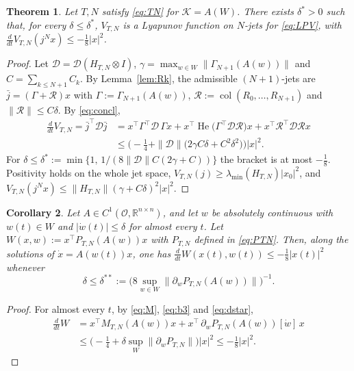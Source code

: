 \documentclass[preprint,12pt,authoryear]{elsarticle}
\newtheorem{theorem}{Theorem}
\newtheorem{corollary}[theorem]{Corollary}
\theoremstyle{definition}
\theoremstyle{remark}
\newcommand{\R}{\mathbb{R}}
\newcommand{\tr}{^{\top}}
\newcommand{\DD}{\mathcal{D}}
\newcommand{\KK}{\mathcal{K}}
\DeclareMathOperator{\He}{He}
\DeclareMathOperator{\col}{col}
\begin{document}
\begin{theorem}\label{thm:tv}
Let $T,N$ satisfy \eqref{eq:TN} for $\KK=A(W)$. There exists $\delta^*>0$ such that, for every $\delta\le\delta^*$, $V_{T,N}$ is a Lyapunov function on $N$-jets for \eqref{eq:LPV}, with $\frac{d}{dt}V_{T,N}(j^Nx)\le-\frac18|x|^2$.
\end{theorem}
\begin{proof}
Let $\DD=\DD(H_{T,N}\otimes I)$, $\gamma=\max_{w\in W}\|\Gamma_{N+1}(A(w))\|$ and $C=\sum_{k\le N+1}C_k$. By Lemma~\ref{lem:Rk}, the admissible $(N+1)$-jets are $\bar j=(\Gamma+\mathcal R)x$ with $\Gamma:=\Gamma_{N+1}(A(w))$, $\mathcal R:=\col(R_0,\dots,R_{N+1})$ and $\|\mathcal R\|\le C\delta$. By \eqref{eq:concl},
\begin{align}
\frac{d}{dt}V_{T,N}=\bar j\tr\DD\bar j
&=x\tr\Gamma\tr\DD\,\Gamma x+x\tr\He\big(\Gamma\tr\DD\mathcal R\big)x+x\tr\mathcal R\tr\DD\mathcal Rx\nonumber\\
&\le\Big(-\tfrac14+\|\DD\|\big(2\gamma C\delta+C^2\delta^2\big)\Big)|x|^2 .
\end{align}
For $\delta\le\delta^*:=\min\{1,\,1/(8\|\DD\|C(2\gamma+C))\}$ the bracket is at most $-\frac18$. Positivity holds on the whole jet space, $V_{T,N}(j)\ge\lambda_{\min}(H_{T,N})|x_0|^2$, and $V_{T,N}(j^Nx)\le\|H_{T,N}\|(\gamma+C\delta)^2|x|^2$.
\end{proof}

\begin{corollary}\label{cor:PDLF}
Let $A\in C^1(\mathcal O,\R^{n\times n})$, and let $w$ be absolutely continuous with $w(t)\in W$ and $|\dot w(t)|\le\delta$ for almost every $t$. Let $W(x,w):=x\tr P_{T,N}(A(w))x$ with $P_{T,N}$ defined in \eqref{eq:PTN}. Then, along the solutions of $\dot x=A(w(t))x$, one has $\frac{d}{dt}W(x(t),w(t))\le-\frac18|x(t)|^2$ whenever
\begin{equation}\label{eq:dstar}
\delta\le\delta^{**}:=\Big(8\sup_{w\in W}\|\partial_wP_{T,N}(A(w))\|\Big)^{-1}.
\end{equation}
\end{corollary}
\begin{proof}
For almost every $t$, by \eqref{eq:M}, \eqref{eq:b3} and \eqref{eq:dstar},
\begin{align}
\frac{d}{dt}W&=x\tr M_{T,N}(A(w))x+x\tr\,\partial_wP_{T,N}(A(w))[\dot w]\,x\nonumber\\&\le\Big(-\frac14+\delta\sup_W\|\partial_wP_{T,N}\|\Big)|x|^2\le-\frac18|x|^2 .
\end{align}
\end{proof}
\end{document}
